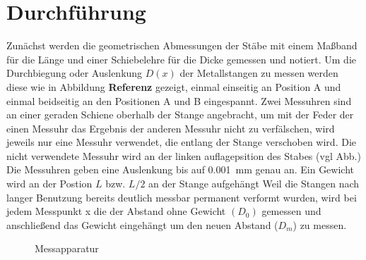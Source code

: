 \section{Durchführung}
Zunächst werden die geometrischen Abmessungen der Stäbe mit einem Maßband für die Länge und einer Schiebelehre für die Dicke
gemessen und notiert.
Um die Durchbiegung oder Auslenkung $D(x)$ der Metallstangen zu messen werden diese wie in Abbildung \textbf{Referenz} gezeigt,
einmal einseitig an Position A und einmal beidseitig an den Positionen A und B eingespannt.
Zwei Messuhren sind an einer geraden Schiene oberhalb der Stange angebracht, um mit der Feder der einen Messuhr das Ergebnis der
anderen Messuhr nicht zu verfälschen, wird jeweils nur eine Messuhr verwendet, die entlang der Stange verschoben wird.
Die nicht verwendete Messuhr wird an der linken auflagepsition des Stabes (vgl Abb.)
Die Messuhren geben eine Auslenkung bis auf \qty{0.001}{\milli\meter} genau an.
Ein Gewicht wird an der Postion $L$ bzw. $L/2$ an der Stange aufgehängt
Weil die Stangen nach langer Benutzung bereits deutlich messbar permanent verformt wurden,
wird bei jedem Messpunkt x die der Abstand ohne Gewicht $(D_0)$ gemessen und anschließend das Gewicht eingehängt 
um den neuen Abstand ($D_m$) zu messen.




\begin{figure}
    
    \caption{Messapparatur}
    \label{fig:Messapparatur}
\end{figure}